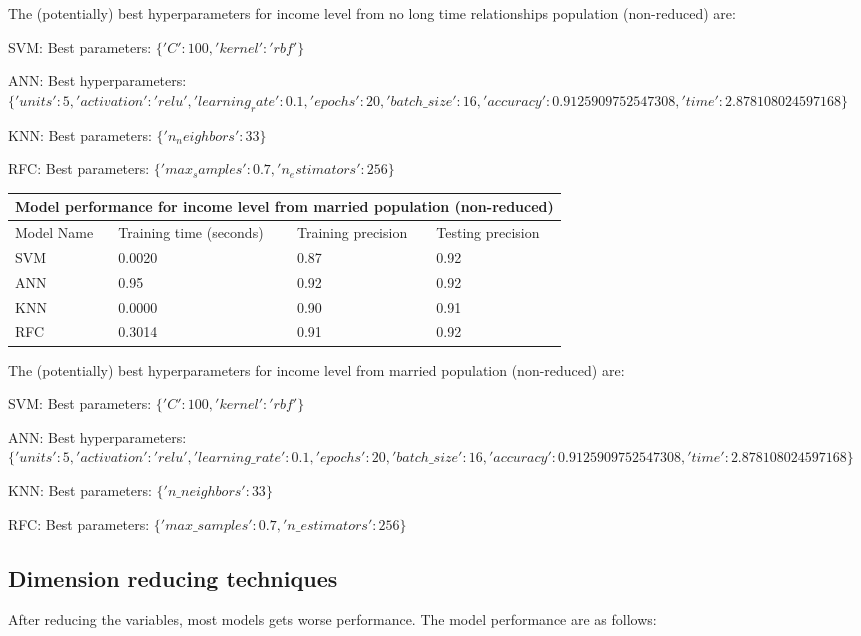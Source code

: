The (potentially) best hyperparameters for income level from no long time relationships population (non-reduced) are:

SVM:
Best parameters: $\{'C': 100, 'kernel': 'rbf'\}$

ANN:
Best hyperparameters: $\{'units': 5, 'activation': 'relu', 'learning_rate': 0.1, 'epochs': 20, 'batch\_size': 16, 'accuracy': 0.9125909752547308, 'time': 2.878108024597168\}$

KNN:
Best parameters: $\{'n_neighbors': 33\}$

RFC:
Best parameters: $\{'max_samples': 0.7, 'n_estimators': 256\}$

\begin{table}[h!]
    \centering
    \begin{tabular}{ |p{3cm}||p{5cm}|p{4cm}|p{4cm}|}
    \hline
    \multicolumn{4}{|c|}{Model performance for income level from married population (non-reduced)} 
     \\
    \hline
    Model Name& Training time (seconds)& Training precision & Testing precision \\
    \hline
    SVM &0.0020   &0.87&0.92\\
    ANN &0.95  & 0.92 & 0.92\\
    KNN &0.0000 & 0.90&0.91\\
    RFC &0.3014 & 0.91&0.92\\
    \hline
   \end{tabular}
\end{table}

The (potentially) best hyperparameters for income level from married population (non-reduced) are:

SVM:
Best parameters: $\{'C': 100, 'kernel': 'rbf'\}$

ANN:
Best hyperparameters: $\{'units': 5, 'activation': 'relu', 'learning\_rate': 0.1, 'epochs': 20, 'batch\_size': 16, 'accuracy': 0.9125909752547308, 'time': 2.878108024597168\}$

KNN:
Best parameters: $\{'n\_neighbors': 33\}$

RFC:
Best parameters: $\{'max\_samples': 0.7, 'n\_estimators': 256\}$

\subsection{Dimension reducing techniques}
After reducing the variables, most models gets worse performance. The model performance are as follows:

